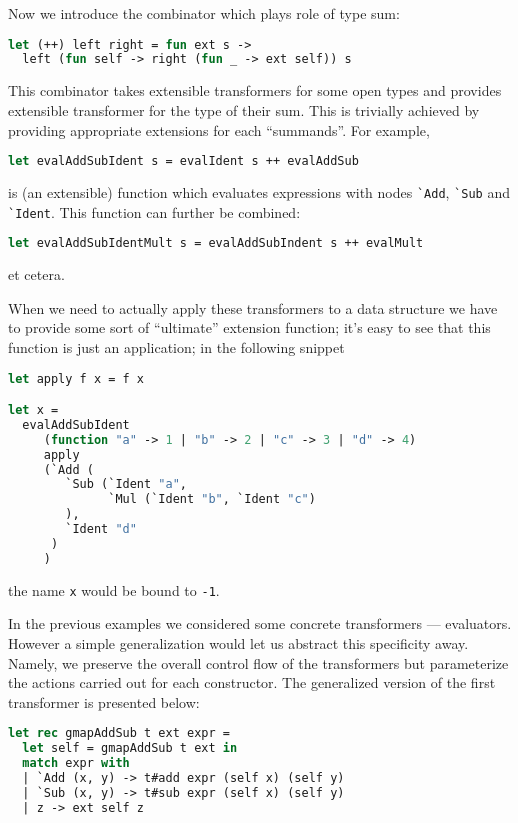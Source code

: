 Now we introduce the combinator which plays role of type sum:

\begin{lstlisting}[language=ocaml]
let (++) left right = fun ext s -> 
  left (fun self -> right (fun _ -> ext self)) s
\end{lstlisting}

This combinator takes extensible transformers for some open types and provides extensible transformer 
for the type of their sum. This is trivially achieved by providing appropriate extensions for each ``summands''.
For example,

\begin{lstlisting}[language=ocaml]
let evalAddSubIdent s = evalIdent s ++ evalAddSub
\end{lstlisting}

is (an extensible) function which evaluates expressions with nodes \lstinline{`Add}, \lstinline{`Sub} and
\lstinline{`Ident}. This function can further be combined:

\begin{lstlisting}[language=ocaml]
let evalAddSubIdentMult s = evalAddSubIndent s ++ evalMult
\end{lstlisting}

et cetera. 

When we need to actually apply these transformers to a data structure we have to provide
some sort of ``ultimate'' extension function; it's easy to see that this function is just
an application; in the following snippet

\begin{lstlisting}[language=ocaml]
let apply f x = f x

let x = 
  evalAddSubIdent 
     (function "a" -> 1 | "b" -> 2 | "c" -> 3 | "d" -> 4)
     apply 
     (`Add (
        `Sub (`Ident "a", 
              `Mul (`Ident "b", `Ident "c")
        ), 
        `Ident "d"
      )
     )
\end{lstlisting}

the name \lstinline{x} would be bound to \lstinline{-1}.

In the previous examples we considered some concrete transformers --- evaluators.
However a simple generalization would let us abstract this specificity away. Namely, 
we preserve the overall control flow of the transformers but parameterize the
actions carried out for each constructor. The generalized version of the first 
transformer is presented below:

\begin{lstlisting}[language=ocaml]
let rec gmapAddSub t ext expr =
  let self = gmapAddSub t ext in
  match expr with
  | `Add (x, y) -> t#add expr (self x) (self y)
  | `Sub (x, y) -> t#sub expr (self x) (self y)
  | z -> ext self z
\end{lstlisting}

